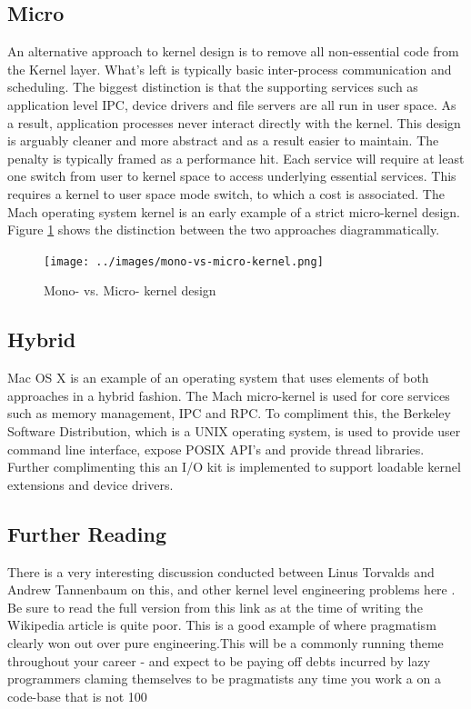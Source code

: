 \documentclass[10pt,a4paper]{article}
\begin{document}
\subsection{Micro}
An alternative approach to kernel design is to remove all non-essential code from the Kernel layer. What's left is typically basic inter-process communication and scheduling. The biggest distinction is that the supporting services such as application level IPC, device drivers and file servers are all run in user space. As a result, application processes never interact directly with the kernel. This design is arguably cleaner and more abstract and as a result easier to maintain. The penalty is typically framed as a performance hit. Each service will require at least one switch from user to kernel space to access underlying essential services. This requires a kernel to user space mode switch, to which a cost is associated. The Mach operating system kernel is an early example of a strict micro-kernel design. Figure \ref{monomicro} shows the distinction between the two approaches diagrammatically. 
\begin{figure}
\caption{Mono- vs. Micro- kernel design}
\begin{center}
\texttt{[image: ../images/mono-vs-micro-kernel.png]}
\label{monomicro}
\end{center}
\end{figure}
\subsection{Hybrid}
Mac OS X is an example of an operating system that uses elements of both approaches in a hybrid fashion. The Mach micro-kernel is used for core services such as memory management, IPC and RPC. To compliment this, the Berkeley Software Distribution, which is a UNIX operating system, is used to provide user command line interface, expose POSIX API's and provide thread libraries. Further complimenting this an I/O kit is implemented to support loadable kernel extensions and device drivers.  
\subsection{Further Reading}
There is a very interesting discussion conducted between Linus Torvalds and Andrew Tannenbaum on this, and other kernel level engineering problems here \cite{LINUSTANNEN}. Be sure to read the full version from this link as at the time of writing the Wikipedia article is quite poor. This is a good example of where pragmatism clearly won out over pure engineering.This will be a commonly running theme throughout your career - and expect to be paying off debts incurred by lazy programmers claming themselves to be pragmatists any time you work a on a code-base that is not 100%
\end{document}
